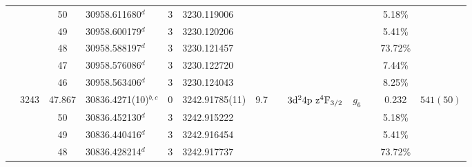 \begin{table*}
\begin{center}
{\begin{tabular}{:l;l;c;l;c;l;c;l;l;c;c;c;c}
\rowstyle{\itshape}               &        & 50        & 30958.611680$^{d}$               & 3 &   3230.119006      &      & $                                        $ & $                                        $ & $      $ &              & 5.18\%    & $          $\\
\rowstyle{\itshape}               &        & 49        & 30958.600179$^{d}$               & 3 &   3230.120206      &      & $                                        $ & $                                        $ & $      $ &              & 5.41\%    & $          $\\
\rowstyle{\itshape}               &        & 48        & 30958.588197$^{d}$               & 3 &   3230.121457      &      & $                                        $ & $                                        $ & $      $ &              & 73.72\%   & $          $\\
\rowstyle{\itshape}               &        & 47        & 30958.576086$^{d}$               & 3 &   3230.122720      &      & $                                        $ & $                                        $ & $      $ &              & 7.44\%    & $          $\\
\rowstyle{\itshape}               &        & 46        & 30958.563406$^{d}$               & 3 &   3230.124043      &      & $                                        $ & $                                        $ & $      $ &              & 8.25\%    & $          $\\
                                  & 3243   & 47.867    & 30836.4271(10)$^{b,c}$           & 0 &    3242.91785(11)  &  9.7 & $                                        $ & $3\rm{d}^24\rm{p~z}^4\rm{F}_{3/2}        $ & $g_{6} $ &              & 0.232     & $  541(50) $\\
\rowstyle{\itshape}               &        & 50        & 30836.452130$^{d}$               & 3 &   3242.915222      &      & $                                        $ & $                                        $ & $      $ &              & 5.18\%    & $          $\\
\rowstyle{\itshape}               &        & 49        & 30836.440416$^{d}$               & 3 &   3242.916454      &      & $                                        $ & $                                        $ & $      $ &              & 5.41\%    & $          $\\
\rowstyle{\itshape}               &        & 48        & 30836.428214$^{d}$               & 3 &   3242.917737      &      & $                                        $ & $                                        $ & $      $ &              & 73.72\%   & $          $\\

\end{tabular}}
\end{center}
\end{table*}
